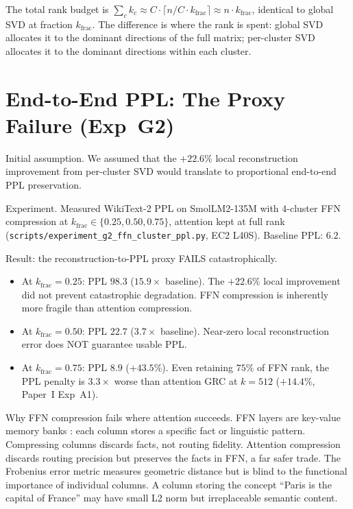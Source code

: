 \documentclass[11pt]{article}
\begin{document}
The total rank budget is $\sum_c k_c \approx C\cdot \lceil n/C \cdot k_\text{frac}\rceil
\approx n\cdot k_\text{frac}$, identical to global SVD at fraction $k_\text{frac}$.
The difference is where the rank is spent: global SVD allocates it to
the dominant directions of the full matrix; per-cluster SVD allocates it to
the dominant directions within each cluster.

\section{End-to-End PPL: The Proxy Failure (Exp~G2)}
\label{sec:g2-ppl}

Initial assumption.  We assumed that the $+22.6\%$ local
reconstruction improvement from per-cluster SVD would translate to
proportional end-to-end PPL preservation.

Experiment.  Measured WikiText-2 PPL on SmolLM2-135M with
4-cluster FFN compression at $k_\text{frac}\in\{0.25,0.50,0.75\}$,
attention kept at full rank (\texttt{scripts/experiment\_g2\_ffn\_cluster\_ppl.py},
EC2 L40S).  Baseline PPL: $6.2$.

Result: the reconstruction-to-PPL proxy FAILS catastrophically.
\begin{itemize}
\item At $k_\text{frac}{=}0.25$: PPL $98.3$ ($15.9{\times}$ baseline).
      The $+22.6\%$ local improvement did not prevent catastrophic
      degradation.  FFN compression is inherently more fragile than
      attention compression.
\item At $k_\text{frac}{=}0.50$: PPL $22.7$ ($3.7{\times}$ baseline).
      Near-zero local reconstruction error does NOT guarantee usable PPL.
\item At $k_\text{frac}{=}0.75$: PPL $8.9$ ($+43.5\%$).  Even retaining
      $75\%$ of FFN rank, the PPL penalty is $3.3{\times}$ worse than
      attention GRC at $k{=}512$ ($+14.4\%$, Paper~I Exp~A1).
\end{itemize}

Why FFN compression fails where attention succeeds.  FFN layers
are key-value memory banks \cite{geva2021ffn}: each column stores a
specific fact or linguistic pattern.  Compressing columns discards
facts, not routing fidelity.  Attention compression discards
routing precision but preserves the facts in FFN, a far safer trade.
The Frobenius error metric measures geometric distance but is blind to
the functional importance of individual columns.  A column storing the
concept ``Paris is the capital of France'' may have small L2 norm but
irreplaceable semantic content.
\end{document}
